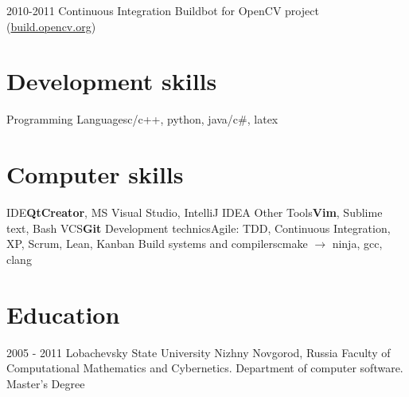 \documentclass[11pt,a4paper]{moderncv}
\begin{document}
\cventry
  {2010-2011}
  {Continuous Integration}
  {}
  {}{}
  {Buildbot for OpenCV project (\url{build.opencv.org})}

\section{Development skills}
\cvline
  {Programming Languages}{c/c++, python, java/c\#, latex}
\section{Computer skills}
  \cvline
  {IDE}{\textbf{QtCreator}, MS Visual Studio, IntelliJ IDEA}
  \cvline
  {Other Tools}{\textbf{Vim}, Sublime text, Bash}
  \cvline
  {VCS}{\textbf{Git}}
  \cvline
  {Development technics}{Agile: TDD, Continuous Integration, XP, Scrum, Lean, Kanban}
  \cvline
  {Build systems and compilers}{cmake $\to$ ninja, gcc, clang}

\section{Education}
  \cventry
    {2005 - 2011}
    {Lobachevsky State University}
    {Nizhny Novgorod, Russia}
    {}{}
    {Faculty of Computational Mathematics and Cybernetics. Department of computer software.\newline{}
    Master's Degree}
\end{document}
